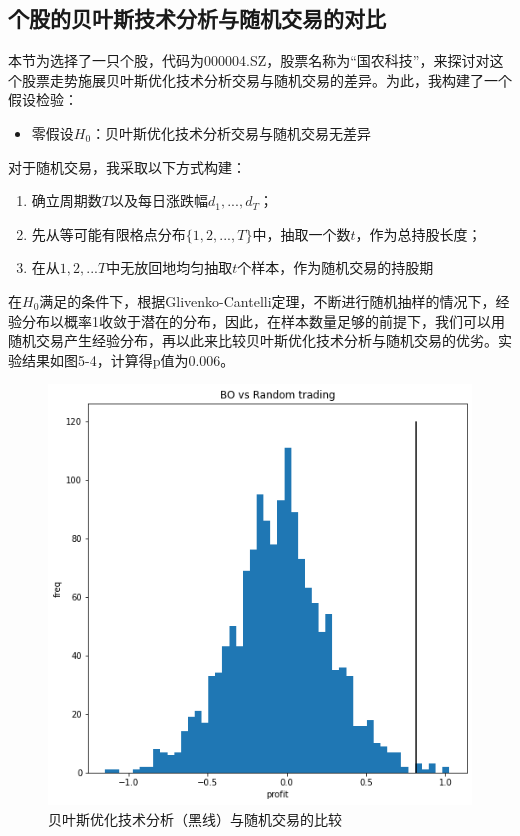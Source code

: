 \documentclass[twoside,longtitle]{LZUthesis}
\begin{document}
\subsection{个股的贝叶斯技术分析与随机交易的对比}
本节为选择了一只个股，代码为000004.SZ，股票名称为“国农科技”，来探讨对这个股票走势施展贝叶斯优化技术分析交易与随机交易的差异。为此，我构建了一个假设检验：
\begin{itemize}
    \item 零假设$H_0$：贝叶斯优化技术分析交易与随机交易无差异
\end{itemize}

对于随机交易，我采取以下方式构建：
\begin{enumerate}
    \item 确立周期数$T$以及每日涨跌幅$d_1,...,d_T$；
    \item 先从等可能有限格点分布$\{1,2,...,T\}$中，抽取一个数$t$，作为总持股长度；
    \item 在从${1,2,...T}$中无放回地均匀抽取$t$个样本，作为随机交易的持股期
\end{enumerate}
在$H_0$满足的条件下，根据Glivenko-Cantelli定理，不断进行随机抽样的情况下，经验分布以概率1收敛于潜在的分布，因此，在样本数量足够的前提下，我们可以用随机交易产生经验分布，再以此来比较贝叶斯优化技术分析与随机交易的优劣。实验结果如图5-4，计算得p值为0.006。
\begin{figure}[h]
    \centering
    \includegraphics[scale=0.7]{fig5-4.png}
    \caption{贝叶斯优化技术分析（黑线）与随机交易的比较}
    \label{fig:my_label}
\end{figure}
\end{document}
